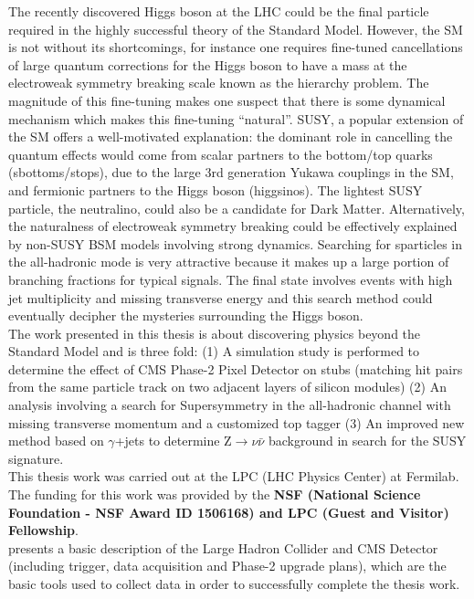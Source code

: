 The recently discovered Higgs boson at the LHC could be the final particle required in the highly successful theory of the Standard Model. However, the SM is not without its shortcomings, for instance one requires fine-tuned cancellations of large quantum corrections for the Higgs boson to have a mass at the electroweak symmetry breaking scale known as the hierarchy problem. The magnitude of this fine-tuning makes one suspect that there is some dynamical mechanism which makes this fine-tuning ``natural''. SUSY, a popular extension of the SM offers a well-motivated explanation: the dominant role in cancelling the quantum effects would come from scalar partners to the bottom/top quarks (sbottoms/stops), due to the large 3rd generation Yukawa couplings in the SM, and fermionic partners to the Higgs boson (higgsinos). The lightest SUSY particle, the neutralino, could also be a candidate for Dark Matter. Alternatively, the naturalness of electroweak symmetry breaking could be effectively explained by non-SUSY BSM models involving strong dynamics. Searching for sparticles in the all-hadronic mode is very attractive because it makes up a large portion of branching fractions for typical signals. The final state involves events with high jet multiplicity and missing transverse energy and this search method could eventually decipher the mysteries surrounding the Higgs boson.\\

The work presented in this thesis is about discovering physics beyond the Standard Model and is three fold: (1) A simulation study is performed to determine the effect of CMS Phase-2 Pixel Detector on stubs (matching hit pairs from the same particle track on two adjacent layers of silicon modules) (2) An analysis involving a search for Supersymmetry in the all-hadronic channel with missing transverse momentum and a customized top tagger (3) An improved new method based on $\gamma$+jets to determine Z$\rightarrow\nu \bar{\nu}$ background in search for the SUSY signature.\\

This thesis work was carried out at the LPC (LHC Physics Center) at Fermilab. The funding for this work was provided by the \textbf{NSF (National Science Foundation - NSF Award ID 1506168) and LPC (Guest and Visitor) Fellowship}.\\

 presents a basic description of the Large Hadron Collider and CMS Detector (including trigger, data acquisition and Phase-2 upgrade plans), which are the basic tools used to collect data in order to successfully complete the thesis work.\\ 

